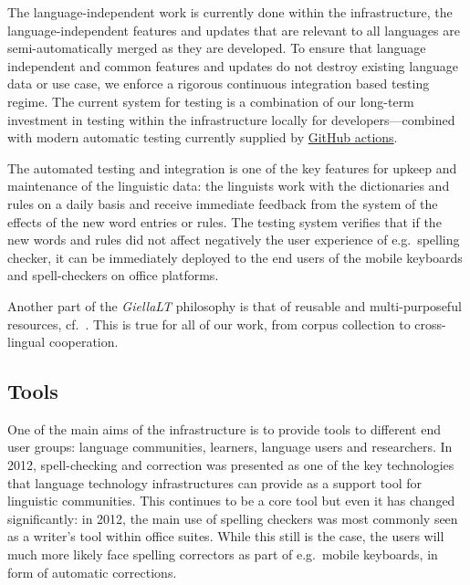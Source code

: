\documentclass[free]{flammie}
\begin{document}
The language-independent work is currently done within the infrastructure, the
language-independent features and updates that are relevant to all languages are
semi-automatically merged as they are developed.  To ensure that language
independent and common features and updates do not destroy existing language
data or use case, we enforce a rigorous continuous integration based testing
regime.  The current system for testing is a combination of our long-term
investment in testing within the infrastructure locally for
developers---combined with modern automatic testing currently supplied by
\href{https://github.com/divvun/actions}{GitHub actions}.

The automated testing and integration is one of the key features for upkeep and
maintenance of the linguistic data: the linguists work with the dictionaries and
rules on a daily basis and receive immediate feedback from the system of the
effects of the new word entries or rules.  The testing system verifies that if
the new words and rules did not affect negatively the user experience of
e.g.\ spelling checker, it can be immediately deployed to the end users of the
mobile keyboards and spell-checkers on office platforms.

Another part of the \textit{GiellaLT} philosophy is that of reusable and
multi-purposeful resources, cf.~\cite{antonsen-etal-2010-reusing}.  This is
true for all of our work, from corpus collection to cross-lingual cooperation.


\subsection{Tools}

One of the main aims of the infrastructure is to provide tools to different end
user groups: language communities, learners, language users and researchers.  In
2012, spell-checking and correction was presented as one of the key technologies
that language technology infrastructures can provide as a support tool for
linguistic communities.  This continues to be a core tool but even it has
changed significantly: in 2012, the main use of spelling checkers was most
commonly seen as a writer's tool within office suites. While this still is the
case, the users will much more likely face spelling correctors as part of
e.g.\ mobile keyboards, in form of automatic corrections.
\end{document}
